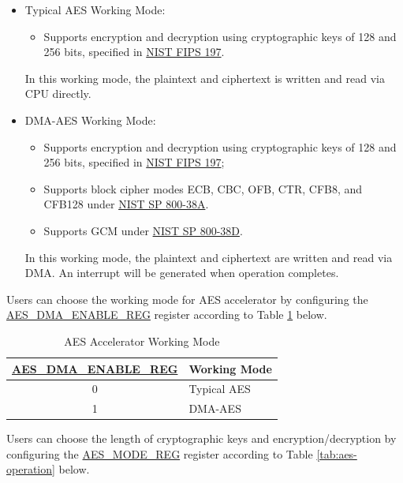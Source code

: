 \documentclass[main\_\_EN.tex]{subfiles}
\begin{document}
\begin{itemize}
    \item Typical AES Working Mode: \begin{itemize}
        \item Supports encryption and decryption using cryptographic keys of 128 and 256 bits, specified in \href{https://nvlpubs.nist.gov/nistpubs/FIPS/NIST.FIPS.197.pdf}{NIST FIPS 197}.
    \end{itemize}
    In this working mode, the plaintext and ciphertext is written and read via CPU directly.
    \item DMA-AES Working Mode:
    \begin{itemize}
        \item Supports encryption and decryption using cryptographic keys of 128 and 256 bits, specified in \href{https://nvlpubs.nist.gov/nistpubs/FIPS/NIST.FIPS.197.pdf}{NIST FIPS 197};
        \item Supports block cipher modes ECB, CBC, OFB, CTR, CFB8, and CFB128 under \href{https://nvlpubs.nist.gov/nistpubs/Legacy/SP/nistspecialpublication800-38a.pdf}{NIST SP 800-38A}.
        \item Supports GCM under \href{https://nvlpubs.nist.gov/nistpubs/Legacy/SP/nistspecialpublication800-38d.pdf}{NIST SP 800-38D}.
    \end{itemize}
    In this working mode, the plaintext and ciphertext are written and read via DMA. An interrupt will be generated when operation completes.
\end{itemize}

Users can choose the working mode for AES accelerator by configuring the \hyperref[regdesc:AESDMAENABLEREG]{AES\_DMA\_ENABLE\_REG} register according to Table \ref{tab:aes-dma-enable} below.

\begin{longtable}[c]{ | c | l | }
\caption{AES Accelerator Working Mode}
    \label{tab:aes-dma-enable}
    \\\hline
    \rowcolor{lightgray}
\textbf{\hyperref[regdesc:AESDMAENABLEREG]{AES\_DMA\_ENABLE\_REG}}      & \textbf{Working Mode}\\
        \hline
        0                       & Typical AES    \\
        \hline
        1                       & DMA-AES        \\
        \hline
\end{longtable}

Users can choose the length of cryptographic keys and encryption/decryption by configuring the \hyperref[regdesc:AESMODEREG]{AES\_MODE\_REG} register according to Table \ref{tab:aes-operation} below.
\end{document}
